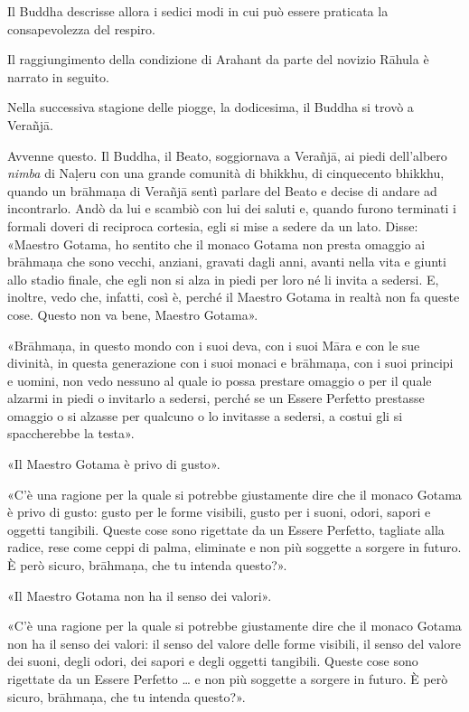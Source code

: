 
 Il Buddha descrisse allora i sedici modi in cui
può essere praticata la consapevolezza del respiro.

 Il raggiungimento della condizione di Arahant da
parte del novizio Rāhula è narrato in seguito.

 Nella successiva stagione delle piogge, la
dodicesima, il Buddha si trovò a Verañjā.

\label{pag137}%
 Avvenne questo. Il Buddha, il Beato, soggiornava a
Verañjā, ai piedi dell’albero \emph{nimba} di Naḷeru con una grande comunità di
bhikkhu, di cinquecento bhikkhu, quando un brāhmaṇa di Verañjā sentì parlare del
Beato e decise di andare ad incontrarlo. Andò da lui e scambiò con lui dei
saluti e, quando furono terminati i formali doveri di reciproca cortesia, egli
si mise a sedere da un lato. Disse: «Maestro Gotama, ho sentito che il monaco
Gotama non presta omaggio ai brāhmaṇa che sono vecchi, anziani, gravati dagli
anni, avanti nella vita e giunti allo stadio finale, che egli non si alza in
piedi per loro né li invita a sedersi. E, inoltre, vedo che, infatti, così è,
perché il Maestro Gotama in realtà non fa queste cose. Questo non va bene,
Maestro Gotama».

«Brāhmaṇa, in questo mondo con i suoi deva, con i suoi Māra e con le sue
divinità, in questa generazione con i suoi monaci e brāhmaṇa, con i suoi
principi e uomini, non vedo nessuno al quale io possa prestare omaggio o per il
quale alzarmi in piedi o invitarlo a sedersi, perché se un Essere Perfetto
prestasse omaggio o si alzasse per qualcuno o lo invitasse a sedersi, a costui
gli si spaccherebbe la testa».

«Il Maestro Gotama è privo di gusto».

«C’è una ragione per la quale si potrebbe giustamente dire che il monaco Gotama
è privo di gusto: gusto per le forme visibili, gusto per i suoni, odori, sapori
e oggetti tangibili. Queste cose sono rigettate da un Essere Perfetto, tagliate
alla radice, rese come ceppi di palma, eliminate e non più soggette a sorgere in
futuro. È però sicuro, brāhmaṇa, che tu intenda questo?».

«Il Maestro Gotama non ha il senso dei valori».

«C’è una ragione per la quale si potrebbe giustamente dire che il monaco Gotama
non ha il senso dei valori: il senso del valore delle forme visibili, il senso
del valore dei suoni, degli odori, dei sapori e degli oggetti tangibili. Queste
cose sono rigettate da un Essere Perfetto … e non più soggette a sorgere in
futuro. È però sicuro, brāhmaṇa, che tu intenda questo?».

